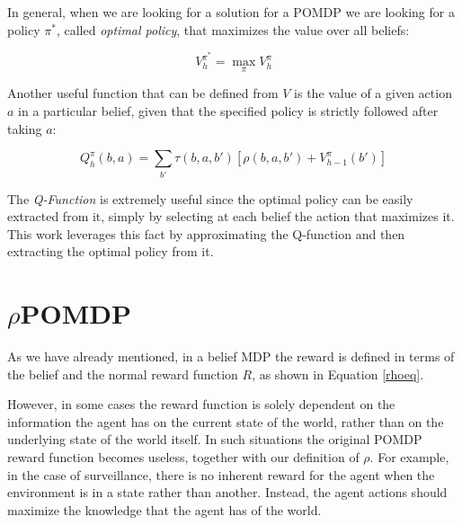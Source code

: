 In general, when we are looking for a solution for a POMDP we are looking for a policy $\pi^*$, called
\textit{optimal policy}, that maximizes the value over all beliefs:

\begin{equation}
 V^{\pi^*}_h = \max_\pi V^{\pi}_h
\end{equation}

Another useful function that can be defined from $V$ is the value of a given action $a$ in a
particular belief, given that the specified policy is strictly followed after taking $a$:

\begin{equation}
 Q^{\pi}_h(b, a) = \sum_{b'} \tau(b,a,b') \left[ \rho(b,a,b') + V^{\pi}_{h-1}(b') \right ]
\end{equation}

The \textit{Q-Function} is extremely useful since the optimal policy can be easily extracted from
it, simply by selecting at each belief the action that maximizes it. This work leverages this fact
by approximating the Q-function and then extracting the optimal policy from it.

\section{$\rho$POMDP}

As we have already mentioned, in a belief MDP the reward is defined in terms of the belief and the
normal reward function $R$, as shown in Equation \ref{rhoeq}.

However, in some cases the reward function is solely dependent on the information the agent has on
the current state of the world, rather than on the underlying state of the world itself. In such
situations the original POMDP reward function becomes useless, together with our definition of
$\rho$.  For example, in the case of surveillance, there is no inherent reward for the agent when
the environment is in a state rather than another. Instead, the agent actions should maximize the
knowledge that the agent has of the world.

%

